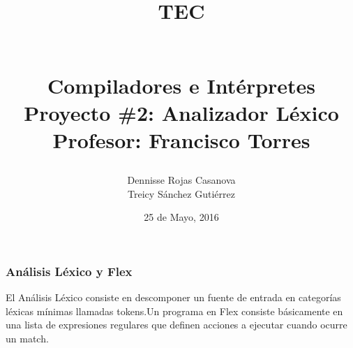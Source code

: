 \documentclass[8, usernames, dvipsnames]{beamer}
\begin{document}
 
\title{
\begin{Large}
TEC
\end{Large}
\newline
\begin{Large}
\\Compiladores e Int\'erpretes
\\Proyecto \#2: Analizador L\'exico
\\Profesor: Francisco Torres
\end{Large}
}
\author{Dennisse Rojas Casanova
\\Treicy S\'anchez Guti\'errez}
\date{25 de Mayo, 2016}
\maketitle 
\begin{frame} 
\frametitle{An\'alisis L\'exico y Flex} 
El An\'alisis L\'exico consiste en descomponer un fuente de entrada en categor\'ias l\'exicas m\'inimas llamadas tokens.Un programa en Flex consiste b\'asicamente en una lista de expresiones regulares que definen acciones a ejecutar cuando ocurre un match.\end{frame} 
\end{document}
